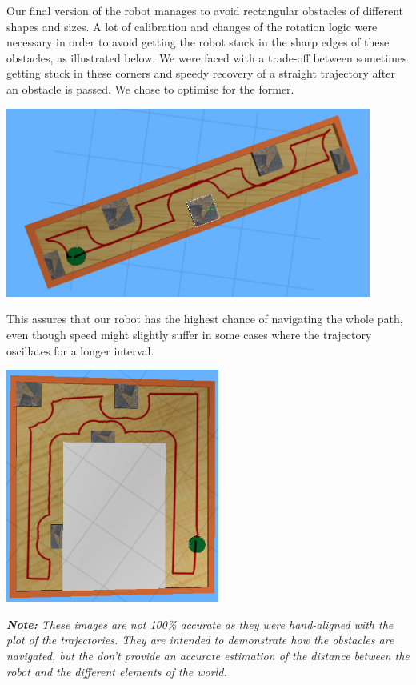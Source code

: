 \documentclass[10pt,a4paper]{article}
\begin{document}
Our final version of the robot manages to avoid rectangular obstacles of
different shapes and sizes. A lot of calibration and changes of the
rotation logic were necessary in order to avoid getting the robot stuck
in the sharp edges of these obstacles, as illustrated below. We were
faced with a trade-off between sometimes getting stuck in these corners
and speedy recovery of a straight trajectory after an obstacle is
passed. We chose to optimise for the former.

\begin{center}
\includegraphics[width=12cm]{images/world1_overlay.png}
\end{center}

This assures that our robot has the highest chance of navigating the whole path, even though speed
might slightly suffer in some cases where the trajectory oscillates for
a longer interval. 

\begin{center}
\includegraphics[width=7cm]{images/world2_overlay.png}
\end{center}

\emph{\textbf{Note:} These images are not 100\% accurate as they were
hand-aligned with the plot of the trajectories. They are intended to
demonstrate how the obstacles are navigated, but the don't provide an
accurate estimation of the distance between the robot and the different
elements of the world.}
\end{document}
